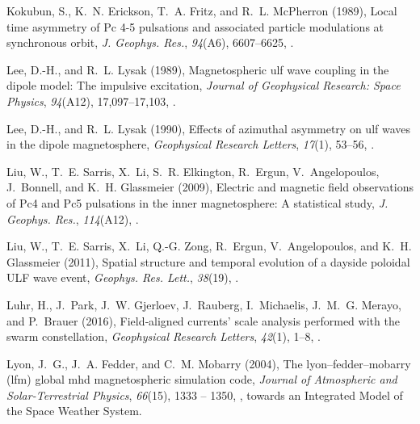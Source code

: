\documentclass[draft,linenumbers]{agujournal}
\begin{document}
\begin{thebibliography}{62}
Kokubun, S., K.~N. Erickson, T.~A. Fritz, and R.~L. McPherron (1989), Local
  time asymmetry of {Pc} 4-5 pulsations and associated particle modulations at
  synchronous orbit, \textit{J. Geophys. Res.}, \textit{94}(A6), 6607--6625,
  .

Lee, D.-H., and R.~L. Lysak (1989), Magnetospheric ulf wave coupling in the
  dipole model: The impulsive excitation, \textit{Journal of Geophysical
  Research: Space Physics}, \textit{94}(A12), 17,097--17,103,
  .

Lee, D.-H., and R.~L. Lysak (1990), Effects of azimuthal asymmetry on ulf waves
  in the dipole magnetosphere, \textit{Geophysical Research Letters},
  \textit{17}(1), 53--56, .

Liu, W., T.~E. Sarris, X.~Li, S.~R. Elkington, R.~Ergun, V.~Angelopoulos,
  J.~Bonnell, and K.~H. Glassmeier (2009), Electric and magnetic field
  observations of {Pc4} and {Pc5} pulsations in the inner magnetosphere: A
  statistical study, \textit{J. Geophys. Res.}, \textit{114}(A12),
  .

Liu, W., T.~E. Sarris, X.~Li, Q.-G. Zong, R.~Ergun, V.~Angelopoulos, and K.~H.
  Glassmeier (2011), Spatial structure and temporal evolution of a dayside
  poloidal {ULF} wave event, \textit{Geophys. Res. Lett.}, \textit{38}(19),
  .

Lu\:hr, H., J.~Park, J.~W. Gjerloev, J.~Rauberg, I.~Michaelis, J.~M.~G. Merayo,
  and P.~Brauer (2016), Field‐aligned currents' scale analysis performed with
  the swarm constellation, \textit{Geophysical Research Letters},
  \textit{42}(1), 1--8, .

Lyon, J.~G., J.~A. Fedder, and C.~M. Mobarry (2004), The
  lyon–fedder–mobarry (lfm) global mhd magnetospheric simulation code,
  \textit{Journal of Atmospheric and Solar-Terrestrial Physics},
  \textit{66}(15), 1333 -- 1350,
  , towards an Integrated
  Model of the Space Weather System.


\end{thebibliography}
\end{document}
